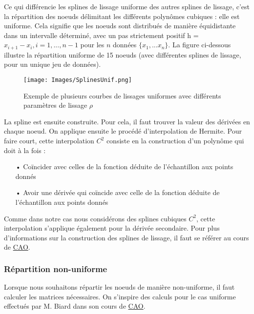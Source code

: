 \documentclass[a4paper,12pt]{article} %
\begin{document}
                Ce qui différencie les splines de lissage uniforme des autres splines de lissage, c'est la répartition des noeuds délimitant les différents polynômes cubiques : elle est uniforme. Cela signifie que les noeuds sont distribués de manière équidistante dans un intervalle déterminé, avec un pas strictement positif h = $x_{i+1} - x_i, i = 1,...,n-1$ pour les $n$ données $\{x_1, ... x_{n}\}$. La figure ci-dessous illustre la répartition uniforme de 15 noeuds (avec différentes splines de lissage, pour un unique jeu de données).
                \begin{figure}[H]
                    \centering
                    \texttt{[image: Images/SplinesUnif.png]}
                    \caption{Exemple de plusieurs courbes de lissages uniformes avec différents paramètres de lissage $\rho$  }
                \end{figure}
                
                La spline est ensuite construite. Pour cela, il faut trouver la valeur des dérivées en chaque noeud. On applique ensuite le procédé d'interpolation de Hermite. Pour faire court, cette interpolation $C^2$ consiste en la construction d'un polynôme qui doit à la fois : 
                \begin{itemize}
                \item[•] Coïncider avec celles de la fonction déduite de l'échantillon aux points donnés
                \item[•] Avoir une dérivée qui coïncide avec celle de la fonction déduite de l'échantillon aux points donnés
                \end{itemize}
                Comme dans notre cas nous considérons des splines cubiques $C^2$, cette interpolation s'applique également pour la dérivée secondaire.
                Pour plus d'informations sur la construction des splines de lissage, il faut se référer au cours de \href{http://www-ljk.imag.fr/membres/Luc.Biard/L3MI_cours/Splines.pdf}{CAO}.
                
            
			\subsubsection{Répartition non-uniforme}
			
			    Lorsque nous souhaitons répartir les noeuds de manière non-uniforme, il faut calculer les matrices nécessaires. On s'inspire des calculs pour le cas uniforme effectués par M. Biard dans son cours de \href{http://www-ljk.imag.fr/membres/Luc.Biard/L3MI_cours/Splines.pdf}{CAO}. \\
			    
\end{document}
